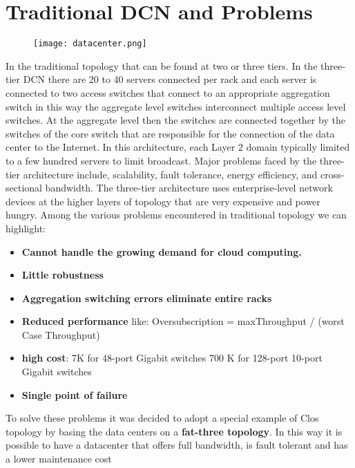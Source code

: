 \documentclass[]{article}
\begin{document}
\section{Traditional DCN and Problems}
\begin{center}
\begin{figure}[htbp]
	\centering
	\texttt{[image: datacenter.png]}
	
\end{figure}
\end{center}
In the traditional topology that can be found at two or three tiers. In the three-tier DCN there are 20 to 40 servers connected per rack and each server is connected to two access switches that connect to an appropriate aggregation switch in this way the aggregate level switches interconnect multiple access level switches. At the aggregate level then the switches are connected together by the switches of the core switch that are responsible for the connection of the data center to the Internet.
In this architecture, each Layer 2 domain typically limited to a few hundred servers to limit broadcast.
Major problems faced by the three-tier architecture include, scalability, fault tolerance, energy efficiency, and cross-sectional bandwidth. The three-tier architecture uses enterprise-level network devices at the higher layers of topology that are very expensive and power hungry.
Among the various problems encountered in traditional topology we can highlight:
\begin{itemize}
	\item \textbf{Cannot handle the growing demand for cloud computing.}
	\item \textbf{Little robustness}
	\item  \textbf{Aggregation switching errors eliminate entire racks}
	\item \textbf{Reduced performance }like: Oversubscription = maxThroughput / (worst Case Throughput)
	\item \textbf{high cost}: 7K for 48-port Gigabit switches 700 K for 128-port 10-port Gigabit switches
	\item \textbf{Single point of failure}
\end{itemize}
To solve these problems it was decided to adopt a special example of Clos topology by basing the data centers on a \textbf{fat-three topology}. In this way it is possible to have a datacenter that offers full bandwidth, is fault tolerant and has a lower maintenance cost
\end{document}
